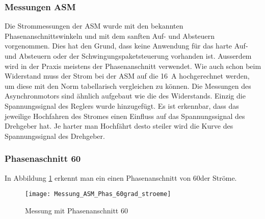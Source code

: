 \newpage
\subsubsection{Messungen ASM}
Die Strommessungen der ASM wurde mit den bekannten Phasenanschnittswinkeln und mit dem sanften Auf- und Absteuern vorgenommen. Dies hat den Grund, dass keine Anwendung für das harte Auf- und Absteuern oder der Schwingungspaketsteuerung vorhanden ist. Ausserdem wird in der Praxis meistens der Phasenanschnitt verwendet. Wie auch schon beim Widerstand muss der Strom bei der ASM auf die \SI{16}{A} hochgerechnet werden, um diese mit den Norm tabellarisch vergleichen zu können. Die Messungen des Asynchronmotors sind ähnlich aufgebaut wie die des Widerstands. Einzig die Spannungssignal des Reglers wurde hinzugefügt. Es ist erkennbar, dass das jeweilige Hochfahren des Stromes einen Einfluss auf das Spannungssignal des Drehgeber hat. Je harter man Hochfährt desto steiler wird die Kurve des Spannungssignal des Drehgeber. 


\subsubsection*{Phasenaschnitt 60\textdegree}
In Abbildung \ref{fig:Mess_Phas_60grad_stroeme} erkennt man ein einen Phasenanschnitt von 60\textdegree der Ströme.

\begin{figure}[ht!]
	\centering
	\texttt{[image: Messung\_ASM\_Phas\_60grad\_stroeme]}	
	\caption{Messung mit Phasenanschnitt 60\textdegree}\label{fig:Mess_Phas_60grad_stroeme}
\end{figure}

